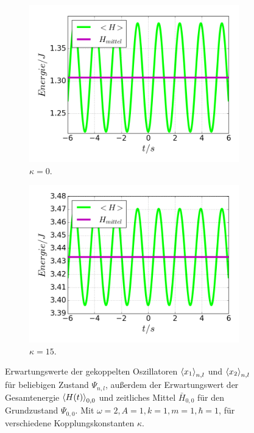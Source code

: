 \begin{figure}
      \begin{subfigure}[t]{0.5\textwidth}
        \centering
        \includegraphics[width=\textwidth]{plots/<H>00_kappa0.png}
        \caption{$\kappa=0$.}
        \label{fig:H_kappa0}
      \end{subfigure}
      \begin{subfigure}[t]{0.5\textwidth}
          \centering
          \includegraphics[width=\textwidth]{plots/<H>00_kappa15.png}
          \caption{$\kappa=15$.}
          \label{fig:H_kappa15}
      \end{subfigure}
      \caption{Erwartungswerte der gekoppelten Oszillatoren $\braket{x_1}_{n,l}$ und $\braket{x_2}_{n,l}$ für beliebigen Zustand $\Psi_{n,l}$, außerdem der Erwartungswert der Gesamtenergie $\braket{H(t)}_{0,0}$ und zeitliches Mittel $\bar H_{0,0}$ für den Grundzustand $\Psi_{0,0}$. Mit $\omega=2 , A=1 , k=1 , m=1 , \hbar=1$, für verschiedene Kopplungskonstanten $\kappa$.}
    \end{figure}
\fi

